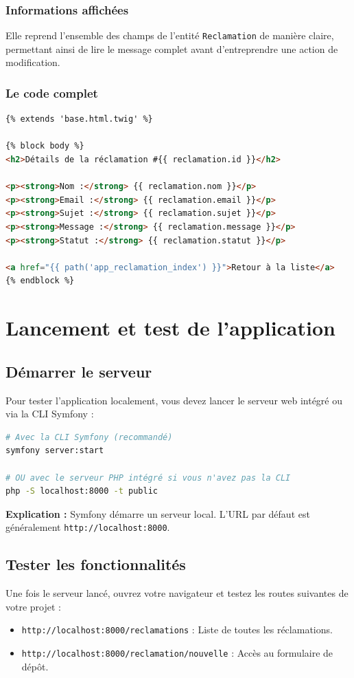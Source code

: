 \documentclass[12pt,a4paper]{article}
\begin{document}
\subsubsection{Informations affichées}
Elle reprend l'ensemble des champs de l'entité \texttt{Reclamation} de manière claire, permettant ainsi de lire le message complet avant d'entreprendre une action de modification.

\subsubsection{Le code complet}
\begin{lstlisting}[language=HTML, caption=templates/reclamation/consulter.html.twig]
{% extends 'base.html.twig' %}

{% block body %}
<h2>Détails de la réclamation #{{ reclamation.id }}</h2>

<p><strong>Nom :</strong> {{ reclamation.nom }}</p>
<p><strong>Email :</strong> {{ reclamation.email }}</p>
<p><strong>Sujet :</strong> {{ reclamation.sujet }}</p>
<p><strong>Message :</strong> {{ reclamation.message }}</p>
<p><strong>Statut :</strong> {{ reclamation.statut }}</p>

<a href="{{ path('app_reclamation_index') }}">Retour à la liste</a>
{% endblock %}
\end{lstlisting}

\section{Lancement et test de l'application}

\subsection{Démarrer le serveur}
Pour tester l'application localement, vous devez lancer le serveur web intégré ou via la CLI Symfony :

\begin{lstlisting}[language=bash, caption=Démarrage du serveur]
# Avec la CLI Symfony (recommandé)
symfony server:start

# OU avec le serveur PHP intégré si vous n'avez pas la CLI
php -S localhost:8000 -t public
\end{lstlisting}

\textbf{Explication :} Symfony démarre un serveur local. L'URL par défaut est généralement \texttt{http://localhost:8000}.

\subsection{Tester les fonctionnalités}
Une fois le serveur lancé, ouvrez votre navigateur et testez les routes suivantes de votre projet :
\begin{itemize}
    \item \texttt{http://localhost:8000/reclamations} : Liste de toutes les réclamations.
    \item \texttt{http://localhost:8000/reclamation/nouvelle} : Accès au formulaire de dépôt.
\end{itemize}
\end{document}
